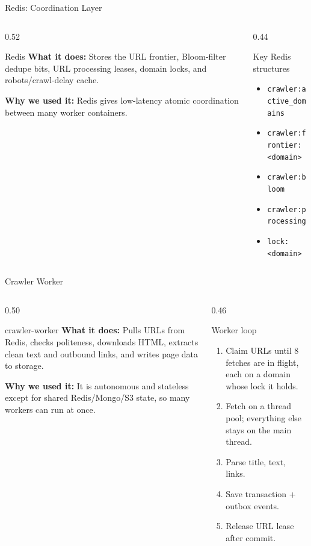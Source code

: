 \documentclass[aspectratio=169,11pt]{beamer}
\newcommand{\component}[3]{%
  \begin{block}{#1}
    \textbf{What it does:} #2

    \vspace{0.35em}
    \textbf{Why we used it:} #3
  \end{block}
}
\begin{document}
\begin{frame}{Redis: Coordination Layer}
  \begin{columns}[T,totalwidth=\textwidth]
    \begin{column}{0.52\textwidth}
      \component{Redis}
      {Stores the URL frontier, Bloom-filter dedupe bits, URL processing leases, domain locks, and robots/crawl-delay cache.}
      {Redis gives low-latency atomic coordination between many worker containers.}
    \end{column}
    \begin{column}{0.44\textwidth}
      \begin{block}{Key Redis structures}
        \begin{itemize}
          \item \texttt{crawler:active\_domains}
          \item \texttt{crawler:frontier:<domain>}
          \item \texttt{crawler:bloom}
          \item \texttt{crawler:processing}
          \item \texttt{lock:<domain>}
        \end{itemize}
      \end{block}
    \end{column}
  \end{columns}
\end{frame}

\begin{frame}{Crawler Worker}
  \begin{columns}[T,totalwidth=\textwidth]
    \begin{column}{0.50\textwidth}
      \component{crawler-worker}
      {Pulls URLs from Redis, checks politeness, downloads HTML, extracts clean text and outbound links, and writes page data to storage.}
      {It is autonomous and stateless except for shared Redis/Mongo/S3 state, so many workers can run at once.}
    \end{column}
    \begin{column}{0.46\textwidth}
      \begin{block}{Worker loop}
        \small
        \begin{enumerate}
          \item Claim URLs until 8 fetches are in flight, each on a domain whose lock it holds.
          \item Fetch on a thread pool; everything else stays on the main thread.
          \item Parse title, text, links.
          \item Save transaction + outbox events.
          \item Release URL lease after commit.
        \end{enumerate}
      \end{block}
    \end{column}
  \end{columns}
\end{frame}
\end{document}

